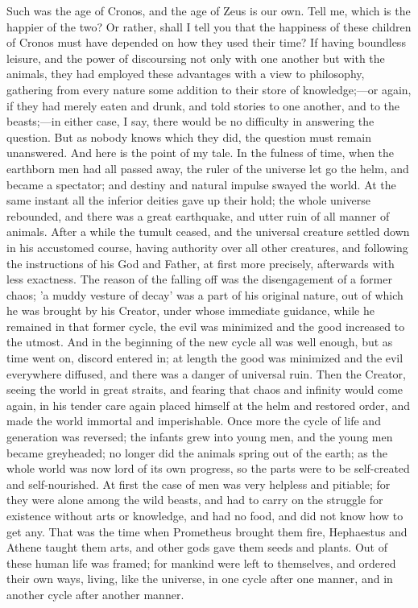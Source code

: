 \documentclass[11pt,letter]{article}
\begin{document}
\par  Such was the age of Cronos, and the age of Zeus is our own. Tell me, which is the happier of the two? Or rather, shall I tell you that the happiness of these children of Cronos must have depended on how they used their time? If having boundless leisure, and the power of discoursing not only with one another but with the animals, they had employed these advantages with a view to philosophy, gathering from every nature some addition to their store of knowledge;—or again, if they had merely eaten and drunk, and told stories to one another, and to the beasts;—in either case, I say, there would be no difficulty in answering the question. But as nobody knows which they did, the question must remain unanswered. And here is the point of my tale. In the fulness of time, when the earthborn men had all passed away, the ruler of the universe let go the helm, and became a spectator; and destiny and natural impulse swayed the world. At the same instant all the inferior deities gave up their hold; the whole universe rebounded, and there was a great earthquake, and utter ruin of all manner of animals. After a while the tumult ceased, and the universal creature settled down in his accustomed course, having authority over all other creatures, and following the instructions of his God and Father, at first more precisely, afterwards with less exactness. The reason of the falling off was the disengagement of a former chaos; 'a muddy vesture of decay' was a part of his original nature, out of which he was brought by his Creator, under whose immediate guidance, while he remained in that former cycle, the evil was minimized and the good increased to the utmost. And in the beginning of the new cycle all was well enough, but as time went on, discord entered in; at length the good was minimized and the evil everywhere diffused, and there was a danger of universal ruin. Then the Creator, seeing the world in great straits, and fearing that chaos and infinity would come again, in his tender care again placed himself at the helm and restored order, and made the world immortal and imperishable. Once more the cycle of life and generation was reversed; the infants grew into young men, and the young men became greyheaded; no longer did the animals spring out of the earth; as the whole world was now lord of its own progress, so the parts were to be self-created and self-nourished. At first the case of men was very helpless and pitiable; for they were alone among the wild beasts, and had to carry on the struggle for existence without arts or knowledge, and had no food, and did not know how to get any. That was the time when Prometheus brought them fire, Hephaestus and Athene taught them arts, and other gods gave them seeds and plants. Out of these human life was framed; for mankind were left to themselves, and ordered their own ways, living, like the universe, in one cycle after one manner, and in another cycle after another manner.
\end{document}
